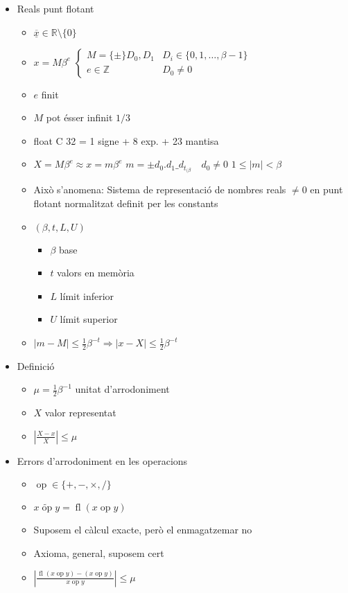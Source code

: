 \documentclass{article}
\newcommand{\Z}{\mathbb{Z}}
\newcommand{\R}{\mathbb{R}}
\DeclareMathOperator{\op}{op}
\DeclareMathOperator{\fl}{fl}
\begin{document}
\begin{itemize}
\item Reals punt flotant
	\begin{itemize}
	\item $\underline{\overline x} \in \R\setminus \{0\}$
	\item $x = M \beta^e$
		\subitem
		$
		\begin{cases}
		M = \{\pm\} D_0, D_1	& D_i \in \{0, 1, \dots, \beta -1\} \\
		e \in \Z		& D_0 \neq 0
		\end{cases}
		$
	\item $e$ finit
	\item $M$ pot ésser infinit $1/3$
	\item float C 32 = 1 signe + 8 exp. + 23 mantisa
	\item $X = M \beta^e \approx x = m \beta^e$
		\subitem $m = \pm d_0.d_1\_d_{t_{(\beta}} \quad d_0 \neq 0$
		\subitem $1 \le |m| < \beta$
	\item Això s'anomena: Sistema de representació de nombres reals $\neq 0$ en punt flotant normalitzat definit per les constants
	\item $(\beta, t, L, U)$
		\begin{itemize}
		\item $\beta$ base
		\item $t$ valors en memòria
		\item $L$ límit inferior
		\item $U$ límit superior
		\end{itemize}
	\item $|m - M| \le \frac{1}{2} \beta^{-t} \Rightarrow |x- X| \le \frac{1}{2} \beta^{-t}$
	\end{itemize}
\item Definició
	\begin{itemize}
	\item $\mu = \frac{1}{2} \beta^{-1}$ unitat d'arrodoniment
	\item $X$ valor representat
	\item $\left|\frac{X-x}{X}\right| \le \mu$
	\end{itemize}

\item Errors d'arrodoniment en les operacions
	\begin{itemize}
	\item $\op \in \{+, -, \times, /\}$
	\item $\widetilde{x\op y} = \fl(x\op y)$
	\item Suposem el càlcul exacte, però el enmagatzemar no
	\item Axioma, general, suposem cert
	\item $\left|\frac{\fl(x\op y) - (x\op y)}{x\op y}\right| \le \mu$
	\end{itemize}


\end{itemize}
\end{document}
